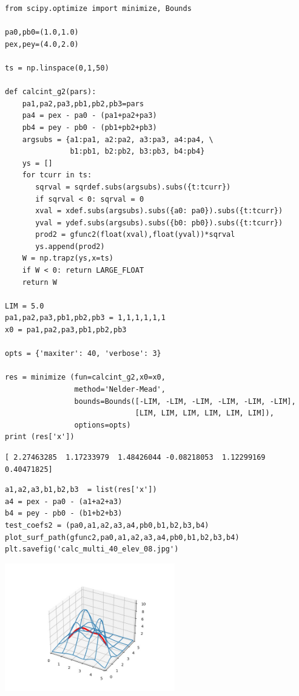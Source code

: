 \documentclass[12pt,fleqn]{article}\usepackage{../../common}
\begin{document}
\begin{verbatim}
from scipy.optimize import minimize, Bounds

pa0,pb0=(1.0,1.0)
pex,pey=(4.0,2.0)

ts = np.linspace(0,1,50)

def calcint_g2(pars):
    pa1,pa2,pa3,pb1,pb2,pb3=pars
    pa4 = pex - pa0 - (pa1+pa2+pa3)
    pb4 = pey - pb0 - (pb1+pb2+pb3)
    argsubs = {a1:pa1, a2:pa2, a3:pa3, a4:pa4, \
               b1:pb1, b2:pb2, b3:pb3, b4:pb4}
    ys = []
    for tcurr in ts:
       sqrval = sqrdef.subs(argsubs).subs({t:tcurr})
       if sqrval < 0: sqrval = 0    
       xval = xdef.subs(argsubs).subs({a0: pa0}).subs({t:tcurr})
       yval = ydef.subs(argsubs).subs({b0: pb0}).subs({t:tcurr})
       prod2 = gfunc2(float(xval),float(yval))*sqrval
       ys.append(prod2)
    W = np.trapz(ys,x=ts)
    if W < 0: return LARGE_FLOAT
    return W
    
LIM = 5.0
pa1,pa2,pa3,pb1,pb2,pb3 = 1,1,1,1,1,1
x0 = pa1,pa2,pa3,pb1,pb2,pb3

opts = {'maxiter': 40, 'verbose': 3}

res = minimize (fun=calcint_g2,x0=x0,
                method='Nelder-Mead',
                bounds=Bounds([-LIM, -LIM, -LIM, -LIM, -LIM, -LIM],
                              [LIM, LIM, LIM, LIM, LIM, LIM]),
                options=opts)
print (res['x'])
\end{verbatim}

\begin{verbatim}
[ 2.27463285  1.17233979  1.48426044 -0.08218053  1.12299169  0.40471825]
\end{verbatim}

\begin{verbatim}
a1,a2,a3,b1,b2,b3  = list(res['x'])
a4 = pex - pa0 - (a1+a2+a3)
b4 = pey - pb0 - (b1+b2+b3)
test_coefs2 = (pa0,a1,a2,a3,a4,pb0,b1,b2,b3,b4)
plot_surf_path(gfunc2,pa0,a1,a2,a3,a4,pb0,b1,b2,b3,b4)
plt.savefig('calc_multi_40_elev_08.jpg')
\end{verbatim}

\includegraphics[width=20em]{calc_multi_40_elev_08.jpg}
\end{document}

